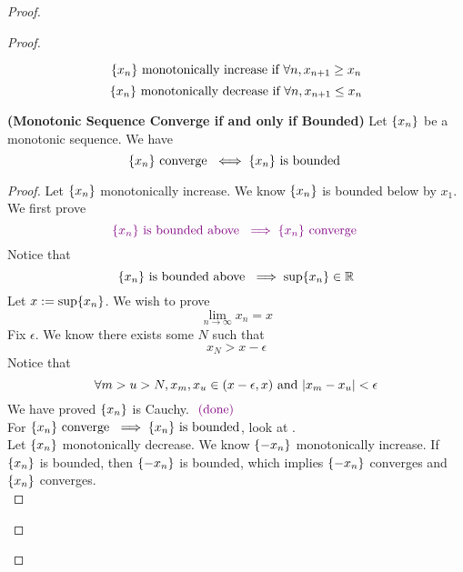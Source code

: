 \documentclass{report}
\begin{document}
\begin{proof}
\begin{proof}
\begin{definition}
\begin{equation}
\{ x_n \}\text{ monotonically increase if }\forall n, x_{n+1}\geq x_n
\end{equation}
\begin{equation}
\{ x_n \}\text{ monotonically decrease if }\forall n, x_{n+1}\leq x_n
\end{equation}
\end{definition}
\begin{theorem}
\label{4.3.10}
\textbf{(Monotonic Sequence Converge if and only if Bounded)} Let $\{ x_n \}$ be a monotonic sequence. We have
\begin{equation}
\{ x_n \}\text{ converge }\iff \{ x_n \}\text{ is bounded }
\end{equation}
\end{theorem}
\begin{proof}
Let $\{ x_n \}$ monotonically increase. We know $\{ x_n \}$ is bounded below by $x_1$. We first prove
\begin{equation}
  \textcolor{violet}{\{ x_n \}\text{ is bounded above }\implies \{ x_n \}\text{ converge }}
\end{equation}
Notice that
\begin{equation}
\{ x_n \}\text{ is bounded above }\implies \sup \{ x_n \}\in\mathbb{R}
\end{equation}
Let $x:=\sup \{ x_n \}$. We wish to prove
\begin{equation}
\lim_{n\to\infty}x_n=x
\end{equation}
Fix $\epsilon $. We know there exists some $N$ such that
 \begin{equation}
x_N>x-\epsilon 
\end{equation}
Notice that
\begin{equation}
\forall m>u>N, x_m,x_u\in (x-\epsilon ,x)\text{ and }|x_m-x_u|<\epsilon 
\end{equation}
We have proved $\{ x_n \}$ is Cauchy. $\textcolor{violet}{\text{ (done) }}$\\


For $\{ x_n \}\text{ converge }\implies \{ x_n \}\text{ is bounded}$, look at .\\

Let $\{ x_n \}$ monotonically decrease. We know $\{ -x_n \}$ monotonically increase. If $\{ x_n \}$ is bounded, then $\{ -x_n \}$ is bounded, which implies $\{ -x_n \}$ converges and $\{ x_n \}$ converges.\\


\end{proof}
\end{proof}
\end{proof}
\end{document}
